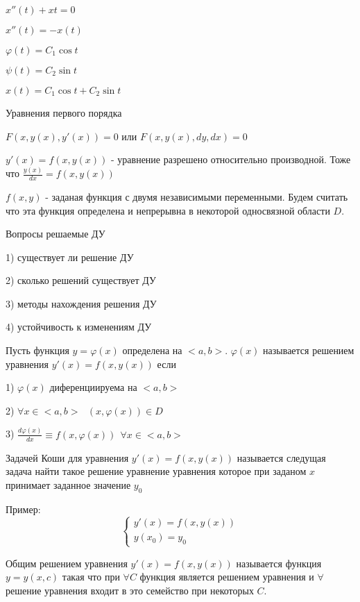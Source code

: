$x''(t) + xt = 0$

$x''(t) = -x(t)$

$\varphi(t) = C_1 \cos t$

$\psi(t) = C_2 \sin t$

$x(t) = C_1 \cos t + C_2 \sin t$

\begin{title}
  Уравнения первого порядка
\end{title}

$F(x, y(x), y'(x)) = 0$ или $F(x, y(x), dy, dx) = 0$

$y'(x) = f(x, y(x))$ - уравнение разрешено относительно производной. Тоже что
$\frac{y(x)}{dx} = f(x, y(x))$

$f(x, y)$ - заданая функция с двумя независимыми переменными. Будем считать что
эта функция определена и непрерывна в некоторой односвязной области $D$.

\begin{center}
  Вопросы решаемые ДУ
\end{center}

1) существует ли решение ДУ

2) сколько решений существует ДУ

3) методы нахождения решения ДУ

4) устойчивость к изменениям ДУ

\begin{define}
  Пусть функция $y = \varphi (x)$ определена на $<a,b>$. $\varphi (x)$
  называется решением уравнения $y'(x) = f(x, y(x))$ если

  1) $\varphi (x)$ диференциируема на $<a,b>$

  2) $\forall x \in <a,b> ~~~ (x, \varphi(x)) \in D$

  3) $\frac{d\varphi (x)}{dx} \equiv f(x, \varphi(x)) ~~ \forall x \in <a,b>$
\end{define}

\begin{define}
  Задачей Коши для уравнения $y'(x) = f(x, y(x))$ называется следущая задача
  найти такое решение уравнение уравнения которое при заданом $x$ принимает
  заданное значение $y_0$
\end{define}
Пример:
$$
\left\{
\begin{array}{l}
  y'(x) = f(x, y(x)) \\
  y(x_0) = y_0
\end{array}
\right.
$$

  Общим решением уравнения $y'(x) = f(x, y(x))$ называется функция $y = y(x,c)$
такая что при $\forall C$ функция является решением уравнения и $\forall$
решение уравнения входит в это семейство при некоторых $C$.

